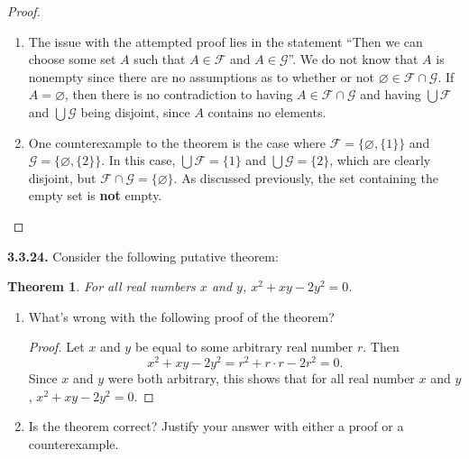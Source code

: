 \documentclass[12pt]{amsart}
\newenvironment{statement}[1]{\smallskip\noindent\color[rgb]{.6627, .3529, .6314} {\bf #1.}}{}
\newtheorem{theorem}{Theorem}
\theoremstyle{definition}
\theoremstyle{remark}
\begin{document}
\begin{proof}
\hfill
\begin{enumerate}
	\item The issue with the attempted proof lies in the statement
	``Then we can choose some set $A$ such that $A \in \mathcal{F}$ and $A \in \mathcal{G}$''.
	We do not know that $A$ is nonempty since there are no assumptions as to whether or not
	$\varnothing \in \mathcal{F} \cap \mathcal{G}$.
	If $A = \varnothing$, then there is no contradiction to having 
	$A \in \mathcal{F} \cap \mathcal{G}$ and having 
	$\bigcup \mathcal{F}$ and $\bigcup \mathcal{G}$ being disjoint,
	since $A$ contains no elements.
	
	\item One counterexample to the theorem is the case where 
	$\mathcal{F} = \{ \varnothing, \{ 1 \} \}$ and
	$\mathcal{G} = \{ \varnothing, \{ 2 \} \}$.
	In this case, $\bigcup \mathcal{F} = \{ 1 \}$ and $\bigcup \mathcal{G} = \{ 2 \}$,
	which are clearly disjoint, but $\mathcal{F} \cap \mathcal{G} = \{ \varnothing \}$.
	As discussed previously, the set containing the empty set is \textbf{not} empty.
\end{enumerate}
\end{proof}


\begin{statement}{3.3.24}
Consider the following putative theorem:
\begin{theorem}
	For all real numbers $x$ and $y$, $x^2 + xy - 2y^2 = 0$.
\end{theorem}
\begin{enumerate}
	\item What's wrong with the following proof of the theorem?
	\begin{proof}
		Let $x$ and $y$ be equal to some arbitrary real number $r$.
		Then
		\begin{equation*}
			x^2 + xy - 2y^2 = r^2 + r \cdot r - 2r^2 = 0.
		\end{equation*}
		Since $x$ and $y$ were both arbitrary, this shows that for all real number
		$x$ and $y$, $x^2 + xy - 2y^2 = 0$.
	\end{proof}
	
	\item Is the theorem correct?
	Justify your answer with either a proof or a counterexample.
\end{enumerate}
\end{statement}
\end{document}
